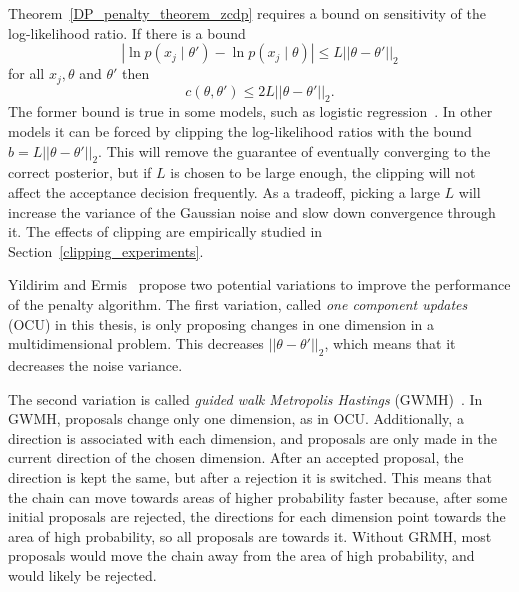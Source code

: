 \documentclass[english,twoside,openright]{HYgraduMLDS}
\begin{document}

Theorem~\ref{DP_penalty_theorem_zcdp}
requires a bound on sensitivity of the log-likelihood ratio. If there is a bound
\[
    |\ln p(x_j\mid \theta') - \ln p(x_j\mid \theta)| \leq L||\theta - \theta'||_2
\]
for all \(x_j, \theta\) and \(\theta'\) then
\[
    c(\theta, \theta') \leq 2L||\theta - \theta'||_2.
\]
The former bound is true in some models, such as logistic
regression~\cite{YildirimE19}. In other
models it can be forced by clipping the log-likelihood ratios with the bound
\(b = L||\theta - \theta'||_{2}\). This will remove the
guarantee of eventually converging to the correct posterior, but if \(L\) is
chosen to be large enough, the clipping will not affect the
acceptance decision frequently. As a tradeoff, picking a large \(L\) will increase
the variance of the Gaussian noise and slow down convergence through it.
The effects of clipping are empirically studied in
Section~\ref{clipping_experiments}.

Yildirim and Ermis~\cite{YildirimE19} propose two potential variations to improve the
performance of the penalty algorithm. The first variation, called
\emph{one component updates} (OCU) in this thesis, is only proposing
changes in one dimension in a multidimensional problem. This decreases
\(||\theta - \theta'||_2\), which means that it decreases the noise variance.

The second variation is called \emph{guided walk Metropolis Hastings}
(GWMH)~\cite{YildirimE19}.
In GWMH, proposals change only one dimension, as in OCU. Additionally, a direction
is associated with each dimension, and proposals are only made in the current
direction of the chosen dimension. After an accepted proposal, the direction is
kept the same, but after a rejection it is switched. This means that the chain can
move towards areas of higher probability faster because, after some initial
proposals are rejected, the directions for each dimension point towards the
area of high probability, so all proposals are towards it. Without GRMH, most
proposals would move the chain away from the area of high probability, and
would likely be rejected.
\end{document}
